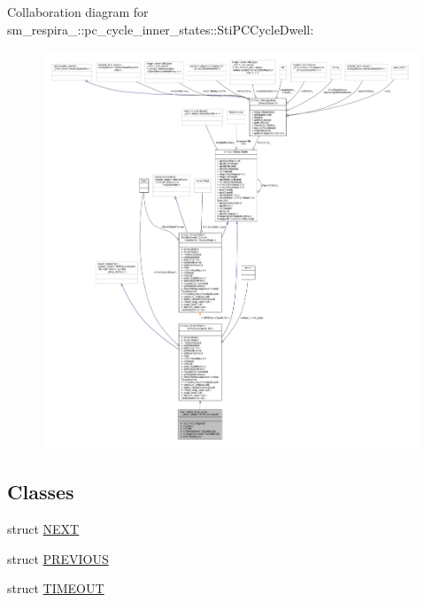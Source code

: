 Collaboration diagram for sm\+\_\+respira\+\_\+:\+:pc\+\_\+cycle\+\_\+inner\+\_\+states\+:\+:Sti\+P\+C\+Cycle\+Dwell\+:
\nopagebreak
\begin{figure}[H]
\begin{center}
\leavevmode
\includegraphics[width=350pt]{structsm__respira__1_1_1pc__cycle__inner__states_1_1StiPCCycleDwell__coll__graph}
\end{center}
\end{figure}
\subsection*{Classes}
\begin{DoxyCompactItemize}
\item 
struct \hyperlink{structsm__respira__1_1_1pc__cycle__inner__states_1_1StiPCCycleDwell_1_1NEXT}{N\+E\+XT}
\item 
struct \hyperlink{structsm__respira__1_1_1pc__cycle__inner__states_1_1StiPCCycleDwell_1_1PREVIOUS}{P\+R\+E\+V\+I\+O\+US}
\item 
struct \hyperlink{structsm__respira__1_1_1pc__cycle__inner__states_1_1StiPCCycleDwell_1_1TIMEOUT}{T\+I\+M\+E\+O\+UT}
\end{DoxyCompactItemize}
